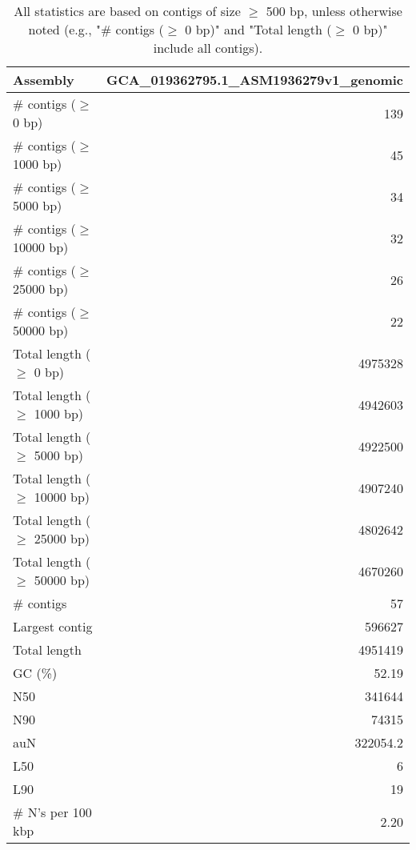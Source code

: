 \documentclass[12pt,a4paper]{article}
\begin{document}
\begin{table}[ht]
\begin{center}
\caption{All statistics are based on contigs of size $\geq$ 500 bp, unless otherwise noted (e.g., "\# contigs ($\geq$ 0 bp)" and "Total length ($\geq$ 0 bp)" include all contigs).}
\begin{tabular}{|l*{1}{|r}|}
\hline
Assembly & GCA\_019362795.1\_ASM1936279v1\_genomic \\ \hline
\# contigs ($\geq$ 0 bp) & 139 \\ \hline
\# contigs ($\geq$ 1000 bp) & 45 \\ \hline
\# contigs ($\geq$ 5000 bp) & 34 \\ \hline
\# contigs ($\geq$ 10000 bp) & 32 \\ \hline
\# contigs ($\geq$ 25000 bp) & 26 \\ \hline
\# contigs ($\geq$ 50000 bp) & 22 \\ \hline
Total length ($\geq$ 0 bp) & 4975328 \\ \hline
Total length ($\geq$ 1000 bp) & 4942603 \\ \hline
Total length ($\geq$ 5000 bp) & 4922500 \\ \hline
Total length ($\geq$ 10000 bp) & 4907240 \\ \hline
Total length ($\geq$ 25000 bp) & 4802642 \\ \hline
Total length ($\geq$ 50000 bp) & 4670260 \\ \hline
\# contigs & 57 \\ \hline
Largest contig & 596627 \\ \hline
Total length & 4951419 \\ \hline
GC (\%) & 52.19 \\ \hline
N50 & 341644 \\ \hline
N90 & 74315 \\ \hline
auN & 322054.2 \\ \hline
L50 & 6 \\ \hline
L90 & 19 \\ \hline
\# N's per 100 kbp & 2.20 \\ \hline
\end{tabular}
\end{center}
\end{table}
\end{document}
